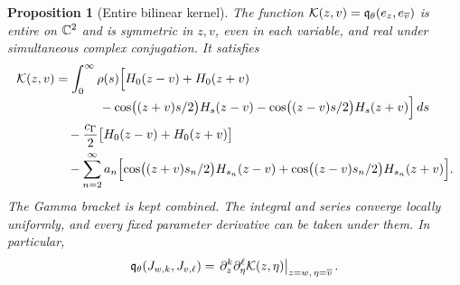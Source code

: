 \documentclass[11pt,a4paper]{article}
\numberwithin{equation}{section}
\newtheorem{proposition}[theorem]{Proposition}
\theoremstyle{definition}\newtheorem{definition}[theorem]{Definition}
\theoremstyle{remark}\newtheorem{remark}[theorem]{Remark}
\begin{document}
\begin{proposition}[Entire bilinear kernel]\label{e:prop:kernel}
The function
$\mathcal K(z,v)=\mathfrak q_\theta(e_z,e_{\overline v})$ is entire on $\mathbb C^2$ and is
symmetric in $z,v$, even in each variable, and real under simultaneous
complex conjugation. It satisfies
\begin{align}\label{e:eq:kernel}
 \mathcal K(z,v)
 &=\int_0^\infty\rho(s)\Bigl[
 H_0(z-v)+H_0(z+v)\notag\\[-2pt]
 &\hspace{3.5em}-\cos\bigl((z+v)s/2\bigr)H_s(z-v)
 -\cos\bigl((z-v)s/2\bigr)H_s(z+v)\Bigr]\,ds\notag\\
 &\quad-\frac{c_\Gamma}{2}\bigl[H_0(z-v)+H_0(z+v)\bigr]\notag\\
 &\quad-\sum_{n=2}^\infty a_n\Bigl[
 \cos\bigl((z+v)s_n/2\bigr)H_{s_n}(z-v)
 +\cos\bigl((z-v)s_n/2\bigr)H_{s_n}(z+v)\Bigr].
\end{align}
The Gamma bracket is kept combined. The integral and series converge
locally uniformly, and every fixed parameter derivative can be taken under
them. In particular,
\begin{equation}\label{e:eq:jet-matrix}
 \mathfrak q_\theta(J_{w,k},J_{v,\ell})
 =\left.\partial_z^k\partial_\eta^\ell\mathcal K(z,\eta)
 \right|_{z=w,\,\eta=\overline v}.
\end{equation}
\end{proposition}
\end{document}
